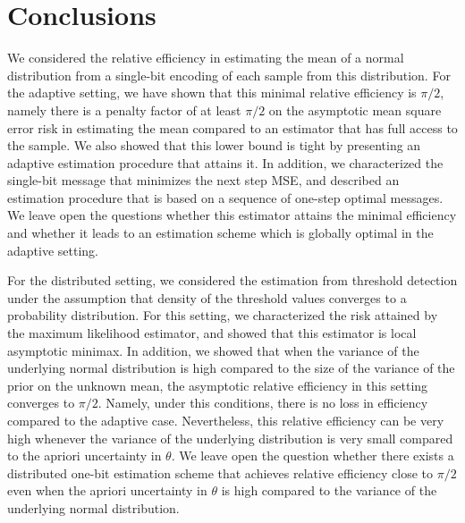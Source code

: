 \documentclass[letterpaper, conference]{IEEEtran}      %
\begin{document}
\section{Conclusions \label{sec:conclusions}}
We considered the relative efficiency in estimating the mean of a normal distribution from a single-bit encoding of each sample from this distribution. For the adaptive setting, we have shown that this minimal relative efficiency is $\pi/2$, namely there is a penalty factor of at least $\pi/2$ on the asymptotic mean square error risk in estimating the mean compared to an estimator that has full access to the sample. We also showed that this lower bound is tight by presenting an adaptive estimation procedure that attains it.
In addition, we characterized the single-bit message that minimizes the next step MSE, and described an estimation procedure that is based on a sequence of one-step optimal messages. We leave open the questions whether this estimator attains the minimal efficiency and whether it leads to an estimation scheme which is globally optimal in the adaptive setting. \par
For the distributed setting, we considered the estimation from threshold detection under the assumption that density of the threshold values converges to a probability distribution. For this setting, we characterized the risk attained by the maximum likelihood estimator, and showed that this estimator is local asymptotic minimax. In addition, we showed that when the variance of the underlying normal distribution is high compared to the size of the variance of the prior on the unknown mean, the asymptotic relative efficiency in this setting converges to $\pi/2$. Namely, under this conditions, there is no loss in efficiency compared to the adaptive case. Nevertheless, this relative efficiency can be very high whenever the variance of the underlying distribution is very small compared to the apriori uncertainty in $\theta$. We leave open the question whether there exists a distributed one-bit estimation scheme that achieves relative efficiency close to $\pi/2$ even when the apriori uncertainty in $\theta$ is high compared to the variance of the underlying normal distribution.

\end{document}
